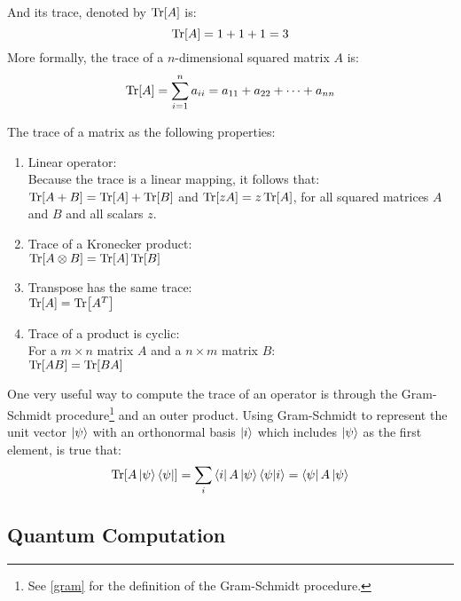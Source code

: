 And its trace, denoted by $\Tr[A]$ is:
$$
\Tr[A] = 1 + 1 + 1 = 3
$$
More formally, the trace of a $n$-dimensional squared matrix $A$ is:
$$
\Tr[A] = \sum_{i=1}^{n} a_{ii} = a_{11} + a_{22} + \cdots + a_{nn}
$$


The trace of a matrix as the following properties:
\begin{enumerate}
	\item Linear operator: \\
	Because the trace is a linear mapping, it follows that:\\
	$\Tr[A+B] = \Tr[A] + \Tr[B]$ and $\Tr[zA] = z \Tr[A]$, for all squared matrices $A$ and $B$ and all scalars $z$.
	\item Trace of a Kronecker product: \\
	$\Tr[A \otimes B] = \Tr[A]\Tr[B]$
	\item Transpose has the same trace: \\
	$\Tr[A]=\Tr[A^T]$
	\item Trace of a product is cyclic: \\
	For a $m \times n$ matrix $A$ and a $n \times m$ matrix $B$:\\
	$\Tr[AB]=\Tr[BA]$
\end{enumerate}

One very useful way to compute the trace of an operator is through the Gram-Schmidt procedure\footnote{See \ref{gram} for the definition of the Gram-Schmidt procedure.} and an outer product. 
Using Gram-Schmidt to represent the unit vector $\ket{\psi}$ with an orthonormal basis $\ket{i}$ which includes $\ket{\psi}$ as the first element, is true that:
$$
\Tr[A\ket{\psi}\bra{\psi}] = \sum_i \bra{i}A\ket{\psi}\bra{\psi}\ket{i} = \bra{\psi}A\ket{\psi}
$$


\subsection{Quantum Computation}

